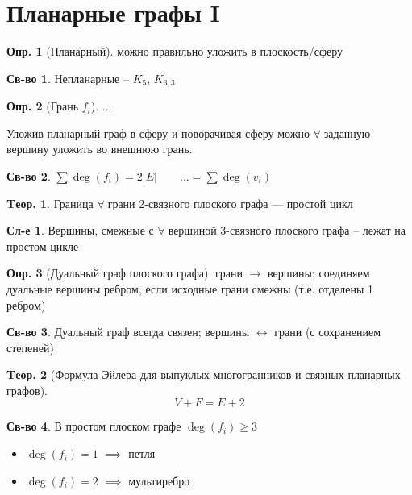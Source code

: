 \documentclass[a4paper,12pt]{article}
\numberwithin{figure}{section}
\theoremstyle{definition}
\newtheorem{definition}{Опр.}[section]
\newtheorem*{property}{Св-во}  %
\theoremstyle{definition}
\newtheorem{theorem}{Tеор.}[section]
\newtheorem*{corollary}{Сл-е} %
\def\iiany{$\forall\;$}
\begin{document}
\section{Планарные графы I}

\begin{definition}[Планарный] можно правильно уложить в плоскость/сферу \end{definition}

\begin{property} Непланарные -- $K_5$, $K_{3,3}$ \end{property}

\begin{definition}[Грань $f_i$] ... \end{definition}

Уложив планарный граф в сферу и поворачивая сферу можно \iiany заданную вершину уложить во внешнюю грань.

\begin{property} $ \sum{\deg(f_i)} = 2|E| \qquad ... = \sum{\deg(v_i)}$ \end{property}

\begin{theorem}	Граница \iiany грани 2-связного плоского графа --- простой цикл \end{theorem}

\begin{corollary}
	Вершины, смежные с \iiany вершиной 3-связного плоского графа -- лежат на простом цикле
\end{corollary}

\begin{definition}[Дуальный граф плоского графа]
	грани $\longrightarrow$ вершины; соединяем дуальные вершины ребром, если исходные грани смежны (т.е. отделены 1 ребром)
\end{definition}

\begin{property}
	Дуальный граф всегда связен; вершины $\longleftrightarrow$ грани (с сохранением степеней)
\end{property}

\begin{theorem}[Формула Эйлера для выпуклых многогранников и связных планарных графов]
	\[ V+F = E+2 \]
\end{theorem}

\begin{property}
	В простом плоском графе $\deg(f_i) \geqslant 3$
	\begin{itemize}
		\item $\deg(f_i)=1$ $\implies$ петля
		\item $\deg(f_i)=2$ $\implies$ мультиребро
	\end{itemize}
\end{property}
\end{document}
